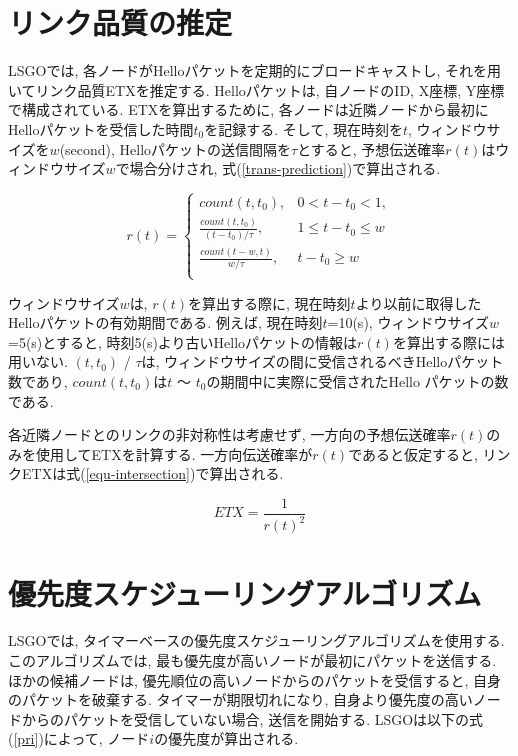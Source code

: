 \documentclass[10pt]{jreport}
\begin{document}
\section{リンク品質の推定}
LSGOでは, 各ノードがHelloパケットを定期的にブロードキャストし, それを用いてリンク品質ETXを推定する. Helloパケットは, 自ノードのID, X座標, Y座標で構成されている. ETXを算出するために, 各ノードは近隣ノードから最初にHelloパケットを受信した時間$t_{0}$を記録する. そして, 現在時刻を$t$, ウィンドウサイズを$w$(second), Helloパケットの送信間隔を$\tau$とすると, 予想伝送確率$r(t)$はウィンドウサイズ$w$で場合分けされ, 式(\ref{trans-prediction})で算出される.

\begin{equation}
	\label{trans-prediction}
	r(t) =\begin{cases}count(t, t_{0}), & 0 < t - t_{0} < 1,  \\ \frac{count(t,t_{0})}{(t-t_{0}) / \tau}, & 1 \leq t - t_{0} \leq w\\
		\frac{count(t - w,t)}{w / \tau}, &  t - t_{0} \geq w\\
	\end{cases}
\end{equation}


ウィンドウサイズ$w$は, $r(t)$を算出する際に, 現在時刻$t$より以前に取得したHelloパケットの有効期間である. 例えば, 現在時刻$t$=10(s), ウィンドウサイズ$w$=5(s)とすると, 時刻5(s)より古いHelloパケットの情報は$r(t)$を算出する際には用いない. $(t,t_{0})$ / $\tau$は, ウィンドウサイズの間に受信されるべきHelloパケット数であり, $count(t,t_{0})$は$t$ ～ $t_{0}$の期間中に実際に受信されたHello パケットの数である. \par
各近隣ノードとのリンクの非対称性は考慮せず, 一方向の予想伝送確率$r(t)$のみを使用してETXを計算する. 一方向伝送確率が$r(t)$であると仮定すると, リンクETXは式(\ref{equ-intersection})で算出される.

\begin{equation}
	\label{equ-intersection}
	ETX = \frac{1}{  {r(t)}^{2}   } 
\end{equation}

\section{優先度スケジューリングアルゴリズム}

LSGOでは, タイマーベースの優先度スケジューリングアルゴリズムを使用する. このアルゴリズムでは, 最も優先度が高いノードが最初にパケットを送信する. ほかの候補ノードは, 優先順位の高いノードからのパケットを受信すると, 自身のパケットを破棄する. タイマーが期限切れになり, 自身より優先度の高いノードからのパケットを受信していない場合, 送信を開始する. LSGOは以下の式(\ref{pri})によって, ノード$i$の優先度が算出される.
\end{document}
